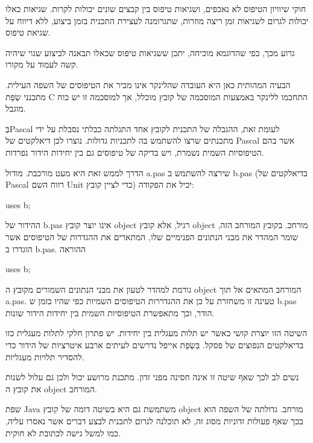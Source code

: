 \begin{טבלא}[!htbp]
      חוקי שיוויון הטיפוס לא נאכפים, ושגיאות טיפוס בין קבצים שונים יכולות לקרות. שגיאות כאלו יכולות לגרום לשגיאות זמן ריצה מוזרות, שתגרומנה לעצירת התכנית בזמן ביצוע, ללא דיווח על שגיאת טיפוס.

      גרוע מכך, כפי שהדוגמא מוכיחה, יתכן ששגיאות טיפוס שכאלו תבאנה לביצוע שגוי שיהיה קשה לעמוד על מקורו.

      הבעיה המהותית כאן היא העובדה שהלינקר אינו מכיר את הטיפוסים של השפה העילית. מתכנני שְׂפַת C התחכמו ללינקר באמצעות המוסכמה של קובץ מוכלל, אך למוסכמה זו יש כוח מוגבל.

      בְּPascal לעומת זאת, ההגבלה של התכנית לקובץ אחד התגלתה כבלתי נסבלת על ידי מתכנתים שרצו להשתמש בה לתכניות גדולות. נוצרו לכן דיאלקטים של Pascal אשר בהם הטיפוסיות השמית נשמרת, ויש בדיקה של טיפוסים גם בין יחידות הידור נפרדות.

      הדרך לממש זאת היא מעט מורכבת. מודול a.pas שירצה להשתמש ב b.pas (בדיאלקטים של Pascal רווח השם Unit כדי לציין קובץ) יכיל את הפקודה:

      uses b;

      ההידור של b.pas אינו יוצר קובץ object רגיל, אלא קובץ object מורחכ. בקובץ המורחב הזה, שומר המהדר את מבני הנתונים הפנימיים שלו, המתארים את ההגדרות של הטיפוסים אשר הוגדרו ב b.pas. ההוראה

      uses b;

      גורמת למהדר לטעון את מבני הנתונים השמורים מקובץ ה object המורחב המתאים אל תוך a.pas. טעינה זו משחזרת על כן את ההגדררות הטיפוסים השמיות כפי שהיו בזמן ש b.pas הודר, וכך מתאפשרת הטיפוסיות השמית בין יחידות הידור שונות.

      השיטה הזו יוצרת קושי כאשר יש תלות מעגלית בין יחידות. יש פתרון חלקי לתלות מעגלית כזו בדיאלקטים הנפוצים של פסקל. בִּשְׂפַת אייפל נדרשים לעיתים ארבע איטרציות של הידור כדי להסדיר תלויות מעגליות.

      נשים לב לכך שאף שיטה זו אינה חסינה מפני זדון. מתכנת מרושע יכול ולכן גם עלול לשנות את קובץ ה object המורחב.

      שפת Java משתמשת גם היא בשיטה דומה של קובץ object מורחב. גדולתה של השפה הוא בכך שאף פעולות זדוניות מסוג זה, לא תוכלנה לגרום לתכנית לבצע דברים אשר נאסרו עליה, כמו למשל גישה לכתובת לא חוקית.


\end{טבלא}
